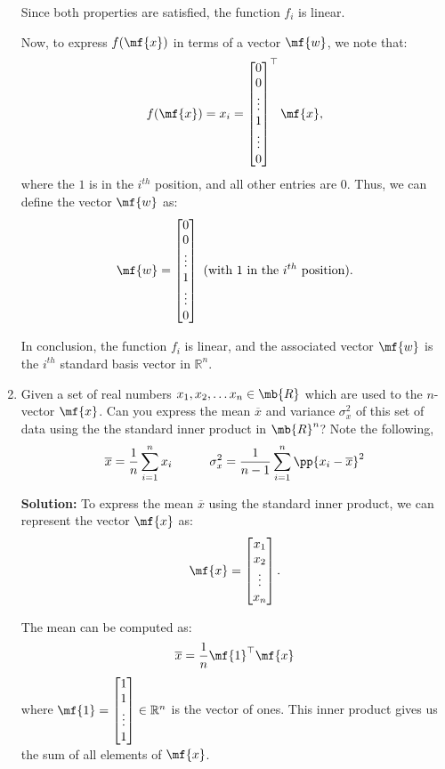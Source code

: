 \begin{enumerate}
\begin{boxedstuff}
        Since both properties are satisfied, the function \( f_i \) is linear.

        Now, to express \( f(\mf{x}) \) in terms of a vector \( \mf{w} \), we note that:
        \[
        f(\mf{x}) = x_i = \begin{bmatrix} 0 \\ 0 \\ \vdots \\ 1 \\ \vdots \\ 0 \end{bmatrix}^\top \mf{x},
        \]
        where the \( 1 \) is in the \( i^{th} \) position, and all other entries are \( 0 \). Thus, we can define the vector \( \mf{w} \) as:
        \[
        \mf{w} = \begin{bmatrix} 0 \\ 0 \\ \vdots \\ 1 \\ \vdots \\ 0 \end{bmatrix} \text{ (with 1 in the \( i^{th} \) position)}.
        \]
        
        In conclusion, the function \( f_i \) is linear, and the associated vector \( \mf{w} \) is the \( i^{th} \) standard basis vector in \( \mathbb{R}^n \).
    \end{boxedstuff}

    \item Given a set of real numbers $x_1, x_2, \ldots x_n \in \mb{R}$ which are used to the $n$-vector $\mf{x}$. Can you express the mean $\overline{x}$ and variance $\sigma_x^2$ of this set of data using the the standard inner product in $\mb{R}^n$? Note the following,
    \[ \overline{x} = \frac{1}{n}\sum_{i=1}^n x_i \quad \quad \quad \sigma_x^2 = \frac{1}{n-1}\sum_{i=1}^n \pp{x_i - \overline{x}}^2 \]
    \begin{boxedstuff}
        \vspace{4mm}
        \textbf{Solution:} To express the mean \( \overline{x} \) using the standard inner product, we can represent the vector \( \mf{x} \) as:
        \[
        \mf{x} = \begin{bmatrix} x_1 \\ x_2 \\ \vdots \\ x_n \end{bmatrix}.
        \]
        
        The mean can be computed as:
        \[
        \overline{x} = \frac{1}{n} \mf{1}^\top \mf{x}
        \]
        where \( \mf{1} = \begin{bmatrix} 1 \\ 1 \\ \vdots \\ 1 \end{bmatrix} \in \mathbb{R}^n \) is the vector of ones. This inner product gives us the sum of all elements of \( \mf{x} \).


\end{boxedstuff}
\end{enumerate}
